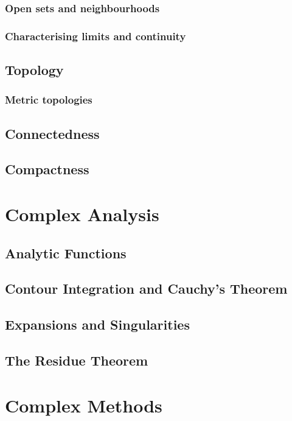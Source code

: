 \documentclass[12pt]{book}
\theoremstyle{definition}
\theoremstyle{remark}
\begin{document}
			\subsection{Open sets and neighbourhoods}
			
			\subsection{Characterising limits and continuity}
			
		\section{Topology}
			\subsection{Metric topologies}
			
		\section{Connectedness}
		
		\section{Compactness}
		
	\chapter{Complex Analysis}
		\section{Analytic Functions}
		
		\section{Contour Integration and Cauchy's Theorem}
		
		\section{Expansions and Singularities}
		
		\section{The Residue Theorem}
		
	\chapter{Complex Methods}
\end{document}

